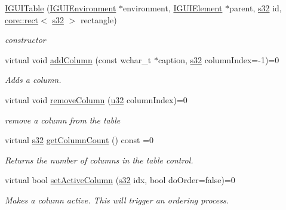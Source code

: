 \begin{DoxyCompactItemize}
\hyperlink{classirr_1_1gui_1_1IGUITable_a5900df485398a4184ed8d8dbbd077f7e}{I\+G\+U\+I\+Table} (\hyperlink{classirr_1_1gui_1_1IGUIEnvironment}{I\+G\+U\+I\+Environment} $\ast$environment, \hyperlink{classirr_1_1gui_1_1IGUIElement}{I\+G\+U\+I\+Element} $\ast$parent, \hyperlink{namespaceirr_ac66849b7a6ed16e30ebede579f9b47c6}{s32} id, \hyperlink{classirr_1_1core_1_1rect}{core\+::rect}$<$ \hyperlink{namespaceirr_ac66849b7a6ed16e30ebede579f9b47c6}{s32} $>$ rectangle)
\begin{DoxyCompactList}\small\item\em constructor \end{DoxyCompactList}\item 
virtual void \hyperlink{classirr_1_1gui_1_1IGUITable_a6ae4360ca563f13a178e69653187e7f6}{add\+Column} (const wchar\+\_\+t $\ast$caption, \hyperlink{namespaceirr_ac66849b7a6ed16e30ebede579f9b47c6}{s32} column\+Index=-\/1)=0
\begin{DoxyCompactList}\small\item\em Adds a column. \end{DoxyCompactList}\item 
\mbox{\label{classirr_1_1gui_1_1IGUITable_a3b86aae404cf9afbbba0fe72dfc56ca4}} 
virtual void \hyperlink{classirr_1_1gui_1_1IGUITable_a3b86aae404cf9afbbba0fe72dfc56ca4}{remove\+Column} (\hyperlink{namespaceirr_a0416a53257075833e7002efd0a18e804}{u32} column\+Index)=0
\begin{DoxyCompactList}\small\item\em remove a column from the table \end{DoxyCompactList}\item 
\mbox{\label{classirr_1_1gui_1_1IGUITable_ac8511fdab2f1d286778eb4dbf3aff22e}} 
virtual \hyperlink{namespaceirr_ac66849b7a6ed16e30ebede579f9b47c6}{s32} \hyperlink{classirr_1_1gui_1_1IGUITable_ac8511fdab2f1d286778eb4dbf3aff22e}{get\+Column\+Count} () const =0
\begin{DoxyCompactList}\small\item\em Returns the number of columns in the table control. \end{DoxyCompactList}\item 
virtual bool \hyperlink{classirr_1_1gui_1_1IGUITable_ae4882275e6695855c0f3ca55e20f554e}{set\+Active\+Column} (\hyperlink{namespaceirr_ac66849b7a6ed16e30ebede579f9b47c6}{s32} idx, bool do\+Order=false)=0
\begin{DoxyCompactList}\small\item\em Makes a column active. This will trigger an ordering process. \end{DoxyCompactList}\item 

\end{DoxyCompactItemize}
